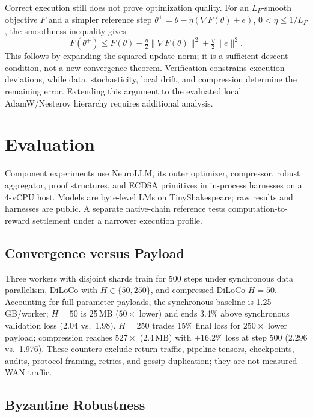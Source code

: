 \documentclass[conference]{IEEEtran}
\begin{document}
Correct execution still does not prove optimization quality. For an $L_F$-smooth objective $F$ and a simpler reference step $\theta^+=\theta-\eta(\nabla F(\theta)+e)$, $0<\eta\leq1/L_F$, the smoothness inequality gives
\begin{equation}
 F(\theta^+)\leq F(\theta)-\tfrac{\eta}{2}\|\nabla F(\theta)\|^2
                   +\tfrac{\eta}{2}\|e\|^2.
\end{equation}
This follows by expanding the squared update norm; it is a sufficient descent condition, not a new convergence theorem. Verification constrains execution deviations, while data, stochasticity, local drift, and compression determine the remaining error. Extending this argument to the evaluated local AdamW/Nesterov hierarchy requires additional analysis.

\section{Evaluation}
\label{sec:eval}

Component experiments use NeuroLLM, its outer optimizer, compressor, robust aggregator, proof structures, and ECDSA primitives in in-process harnesses on a 4-vCPU host. Models are byte-level LMs on TinyShakespeare; raw results and harnesses are public. A separate native-chain reference tests computation-to-reward settlement under a narrower execution profile.



\subsection{Convergence versus Payload}

Three workers with disjoint shards train for 500 steps under synchronous data parallelism, DiLoCo with $H\in\{50,250\}$, and compressed DiLoCo $H=50$. Accounting for full parameter payloads, the synchronous baseline is 1.25\,GB/worker; $H=50$ is 25\,MB ($50\times$ lower) and ends 3.4\% above synchronous validation loss (2.04 vs.\ 1.98). $H=250$ trades 15\% final loss for $250\times$ lower payload; compression reaches $527\times$ (2.4\,MB) with $+16.2\%$ loss at step 500 (2.296 vs.\ 1.976). These counters exclude return traffic, pipeline tensors, checkpoints, audits, protocol framing, retries, and gossip duplication; they are not measured WAN traffic.

\subsection{Byzantine Robustness}
\label{sec:eval-byz}
\end{document}
